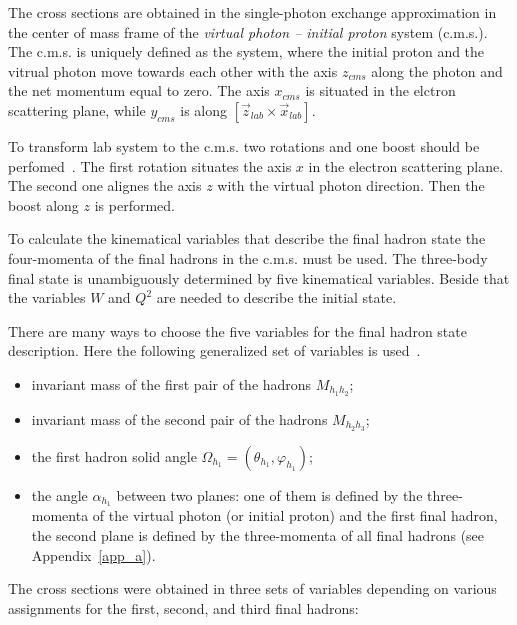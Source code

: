 \documentclass[prc,twocolumn,superscriptaddress,showpacs,amssymb,amsmath,amsfonts,linenumbers,aps]{revtex4-1}
\begin{document}
The cross sections are obtained in the single-photon exchange approximation in the center of mass frame of the {\em virtual photon -- initial proton} system (c.m.s.).   
The c.m.s. is uniquely defined as the system, where the initial proton and the vitrual photon move towards each other with the axis $z_{cms}$ along the photon and the net momentum equal to zero. The axis $x_{cms}$ is situated in the elctron scattering plane, while $y_{cms}$ is along $[\vec z_{lab} \times \vec x_{lab}]$.

To transform lab system to the c.m.s. two rotations and one
boost should be perfomed~\cite{Fed_an_note:2017}.
The first rotation situates the axis $x$ in the electron scattering plane.
The second one alignes the axis $z$ with the virtual photon direction. 
Then the boost along $z$ is performed. 


To calculate the kinematical variables that describe the final hadron state the four-momenta of the final hadrons in the c.m.s. must be used.
The three-body final state is 
unambiguously determined by five kinematical
variables. 
Beside that the variables $W$ and $Q^{2}$ are needed to describe the initial state.
 
There are many ways to choose the five variables for the final hadron state description. Here the following generalized set of
variables is used~\cite{Fed_an_note:2017,Byckling:1971vca}.

\begin{itemize}
\item invariant mass of the first pair of the
hadrons $M_{h_{1}h_{2}}$;
\item invariant mass of the second pair of the
hadrons $M_{h_{2}h_{3}}$;
\item the first hadron solid angle $\Omega_{h_{1}} = (\theta_{h_{1}}, \varphi_{h_{1}})$;
\item the angle $\alpha_{h_{1}}$ between two planes: one of
them is defined by the three-momenta of
the virtual photon (or initial proton) and the first final hadron, the second
plane is defined by the three-momenta of all final hadrons (see Appendix~\ref{app_a}).
\end{itemize}


The cross sections  were obtained in three sets of variables depending on
various assignments for the first, second, and
third final hadrons:
\end{document}
